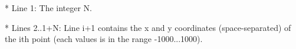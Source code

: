 * Line 1: The integer N.

* Lines 2..1+N: Line i+1 contains the x and y coordinates         (space-separated) of the ith point (each values is in the         range -1000...1000).
